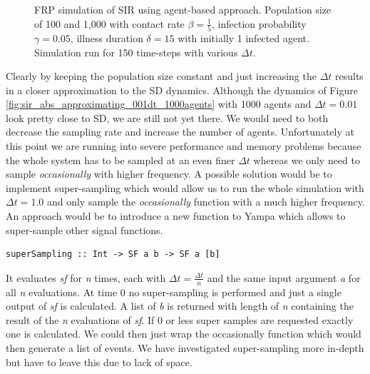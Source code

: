 \begin{figure}
\begin{center}
	\caption{FRP simulation of SIR using agent-based approach. Population size of 100 and 1,000 with contact rate $\beta = \frac{1}{5}$, infection probability $\gamma = 0.05$, illness duration $\delta = 15$ with initially 1 infected agent. Simulation run for 150 time-steps with various $\Delta t$.} 
	\label{fig:sir_abs_dynamics_frp}
\end{center}
\end{figure}

Clearly by keeping the population size constant and just increasing the $\Delta t$ results in a closer approximation to the SD dynamics. Although the dynamics of Figure \ref{fig:sir_abs_approximating_001dt_1000agents} with 1000 agents and $\Delta t = 0.01$ look pretty close to SD, we are still not yet there. We would need to both decrease the sampling rate and increase the number of agents. Unfortunately at this point we are running into severe performance and memory problems because the whole system has to be sampled at an even finer $\Delta t$ whereas we only need to sample \textit{occasionally} with higher frequency. A possible solution would be to implement super-sampling which would allow us to run the whole simulation with $\Delta t = 1.0$ and only sample the \textit{occasionally} function with a much higher frequency. An approach would be to introduce a new function to Yampa which allows to super-sample other signal functions. 

\begin{verbatim}
superSampling :: Int -> SF a b -> SF a [b]
\end{verbatim}

It evaluates \textit{sf} for \textit{n} times, each with $\Delta t = \frac{\Delta t}{n}$ and the same input argument \textit{a} for all \textit{n} evaluations. At time 0 no super-sampling is performed and just a single output of \textit{sf} is calculated. A list of \textit{b} is returned with length of \textit{n} containing the result of the \textit{n} evaluations of \textit{sf}. If 0 or less super samples are requested exactly one is calculated. We could then just wrap the occasionally function which would then generate a list of events. We have investigated super-sampling more in-depth but have to leave this due to lack of space.

